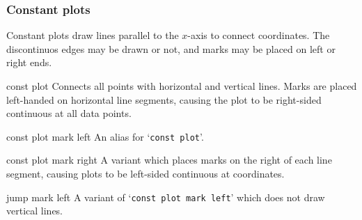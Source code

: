 \subsubsection{Constant plots}
Constant plots draw lines parallel to the $x$-axis to connect coordinates. The discontinuos edges may be drawn or not, and marks may be placed on left or right ends.

\begin{plottype}{const plot}
Connects all points with horizontal and vertical lines. Marks are placed left-handed on horizontal line segments, causing the plot to be right-sided continuous at all data points.

\begin{codeexample}[]
\end{codeexample}
\end{plottype}

\begin{plottype}{const plot mark left}
An alias for `\texttt{const plot}'.
\end{plottype}

\begin{plottype}{const plot mark right}
 A variant which places marks on the right of each line segment, causing plots to be left-sided continuous at coordinates.
\end{plottype}

\begin{plottype}{jump mark left}
A variant of `\texttt{const plot mark left}' which does not draw vertical lines.
\begin{codeexample}[]
\end{codeexample}
\end{plottype}


